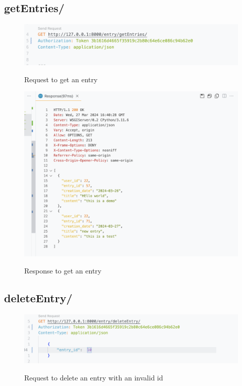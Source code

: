 \subsection{getEntries/}
\begin{figure}[H]
    \caption{Request to get an entry}
    \includegraphics[width=\textwidth]{Assets/api_test/request_get_entry.png}
    \label{fig:request_get_entry}
\end{figure}

\begin{figure}[H]
    \caption{Response to get an entry}
    \includegraphics[width=\textwidth]{Assets/api_test/response_get_entry.png}
    \label{fig:response_get_entry}
\end{figure}

\subsection{deleteEntry/}
\begin{figure}[H]
    \caption{Request to delete an entry with an invalid id}
    \includegraphics[width=\textwidth]{Assets/api_test/request_delete_entry_invalid.png}
    \label{fig:request_delete_entry_invalid}
\end{figure}

